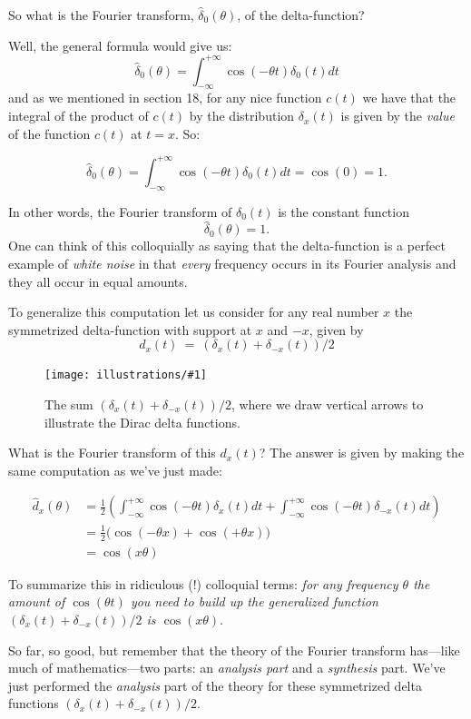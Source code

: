 \documentclass[openany]{book}
\newcommand{\ill}[3]{%
   \begin{figure}[H]%
   \vspace{-2ex}
   \centering%
   \texttt{[image: illustrations/\#1]}%
   \caption{#3}%
   \vspace{-2ex}
    \end{figure}}
\theoremstyle{plain}
\theoremstyle{definition}
\begin{document}
{     So what is the Fourier transform,  ${\hat \delta_0}(\theta)$, of the delta-function?


Well, the general formula would give us:
  $$ {\hat \delta_0}(\theta) = \int_{-\infty}^{+\infty}\cos(-\theta t)\delta_0(t)dt$$
  and as we mentioned in section 18, for any nice function $c(t)$ we
  have that the integral of the product of $c(t)$ by the distribution
  $\delta_x(t)$ is given by the {\it value} of the function $c(t)$ at
  $t=x$.  So:

$$ {\hat \delta_0}(\theta) = \int_{-\infty}^{+\infty}\cos(-\theta t)\delta_0(t)dt = \cos(0) = 1.$$


In other words, the Fourier transform of $\delta_0(t)$ is the constant
function $$ {\hat \delta_0}(\theta)=1.$$ One can think of this
colloquially as saying that the delta-function is a perfect example of
{\it white noise} in that {\it every} frequency occurs in its Fourier
analysis and they all occur in equal amounts.

To generalize this computation let us consider for any real number $x$
the symmetrized delta-function with support at $x$ and $-x$, given
by $$d_x(t) \ = \ (\delta_x(t) + \delta_{-x}(t))/2$$


    \ill{two_delta}{0.4}{The sum $(\delta_x(t) + \delta_{-x}(t))/2$, where we draw vertical arrows to illustrate the Dirac delta functions.}

    What is the Fourier transform of this $d_x(t)$?  The answer is
    given by making the same computation as we've just made:

\begin{align*}\label{dx}
{\hat d_x}(\theta)  &=  {\frac{1}{2}}\left(\int_{-\infty}^{+\infty}\cos(-\theta t)\delta_x(t)dt + \int_{-\infty}^{+\infty}\cos(-\theta t)\delta_{-x}(t)dt\right)\\
    &= {\frac{1}{2}}\big(\cos(-\theta x)+ \cos(+\theta x)\big)\\
    &= \cos(x\theta)
\end{align*}


To summarize this in ridiculous (!) colloquial terms: {\it for any
  frequency $\theta$ the amount of $\cos(\theta t)$ you need to build
  up the generalized function $(\delta_x(t) + \delta_{-x}(t))/2$ is
  $\cos(x\theta).$ }


So far, so good, but remember that the theory of the Fourier transform
has---like much of mathematics---two parts: an {\it analysis part} and
a {\it synthesis} part.  We've just performed the {\it analysis} part
of the theory for these symmetrized delta functions $(\delta_x(t) +
\delta_{-x}(t))/2$.

}
\end{document}
